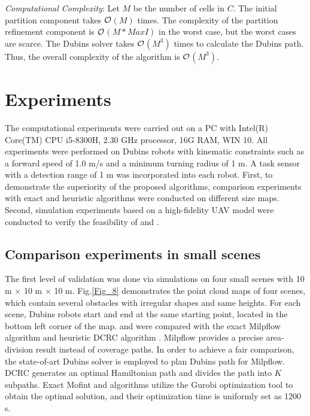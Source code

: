 \documentclass[journal,article,submit,pdftex,moreauthors]{Definitions/mdpi}
\begin{document}
\textit{Computational Complexity}: Let $M$ be the number of cells in $C$. The initial partition component takes $\cal{O}$$(M)$ times. The complexity of the partition refinement component is $\cal{O}$$(M*MaxI)$ in the worst case, but the worst cases are scarce. The Dubins solver takes $\cal{O}$$(M^3)$ times to calculate the Dubins path\cite{frieze1982worst}. Thus, the overall complexity of the  algorithm is $\cal{O}$$(M^3)$.

\section{Experiments}
\label{Sec_Experiments}
The computational experiments were carried out on a PC with Intel(R) Core(TM) CPU i5-8300H, 2.30 GHz processor, 16G RAM, WIN 10. All experiments were performed on Dubins robots with kinematic constraints such as a forward speed of 1.0 m/s and a minimum turning radius of 1 m. A task sensor with a detection range of 1 m was incorporated into each robot. First, to demonstrate the superiority of the proposed algorithms, comparison experiments with exact and heuristic algorithms were conducted on different size maps. Second, simulation experiments based on a high-fidelity UAV model \cite{UAVsimulated} were conducted to verify the feasibility of  and .

\subsection{Comparison experiments in small scenes}

The first level of validation was done via simulations on four small scenes with 10 m $\times$ 10 m $\times$ 10 m. Fig.\ref{Fig_8} demonstrates the point cloud maps of four scenes, which contain several obstacles with irregular shapes and same heights. For each scene, Dubins robots start and end at the same starting point, located in the bottom left corner of the map.  and  were compared with the exact Milpflow algorithm \cite{c39} and heuristic DCRC algorithm \cite{karapetyan2018multi}. Milpflow provides a precise area-division result instead of coverage paths. In order to achieve a fair comparison, the state-of-art Dubins solver \cite{c25} is employed to plan Dubins path for Milpflow. DCRC generates an optimal Hamiltonian path and divides the path into $K$ subpaths. Exact Mofint and  algorithms utilize the Gurobi optimization tool \cite{bixby2007gurobi} to obtain the optimal solution, and their optimization time is uniformly set as 1200 s.
\end{document}

